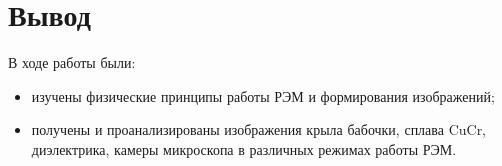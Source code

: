 \documentclass[a4paper,12pt]{article}	%
\begin{document}
\section{Вывод}
	
        В ходе работы были:

        \begin{itemize}
        
            \item изучены физические принципы работы РЭМ и формирования изображений;
            
            \item получены и проанализированы изображения крыла бабочки, сплава CuCr, диэлектрика, камеры микроскопа в различных режимах работы РЭМ.

        \end{itemize}
\end{document}
